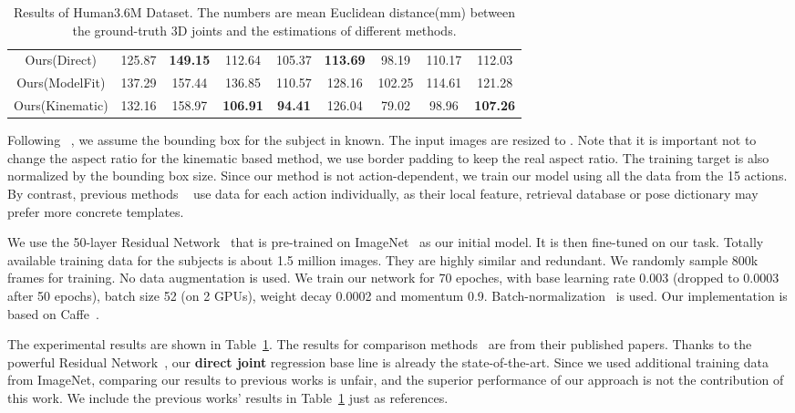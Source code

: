\documentclass[runningheads]{llncs}
\begin{document}
\begin{table}
\begin{center}
\begin{tabular}{ccccccccc}
Ours(Direct) & 125.87 & \bf 149.15 & 112.64 & 105.37 & \bf 113.69 & 98.19 & 110.17 & 112.03 \\
Ours(ModelFit) & 137.29 & 157.44 & 136.85 & 110.57 & 128.16 & 102.25 & 114.61 & 121.28 \\
Ours(Kinematic) & 132.16 & 158.97 & \bf 106.91 & \bf 94.41 & 126.04 & 79.02 & 98.96 & \bf 107.26 \\
\hline
\end{tabular}
\caption{Results of Human3.6M Dataset. The numbers are mean Euclidean distance(mm) between the ground-truth 3D joints and the estimations of different methods.}
\label{table:H36M}
\end{center}
\end{table}
\setlength{\tabcolsep}{1.4pt}

Following ~\cite{li20143d,tekin2016structured}, we assume the bounding box for the subject in known. The input images are resized to . Note that it is important not to change the aspect ratio for the kinematic based method, we use border padding to keep the real aspect ratio. The training target is also normalized by the bounding box size. Since our method is not action-dependent, we train our model using all the data from the 15 actions. By contrast, previous methods ~\cite{h36m_pami,Li_2015_ICCV,Zhou_2016_CVPR} use data for each action individually, as their local feature, retrieval database or pose dictionary may prefer more concrete templates.

We use the 50-layer Residual Network~\cite{He_2016_CVPR} that is pre-trained on ImageNet~\cite{DBLP:journals/corr/RussakovskyDSKSMHKKBBF14} as our initial model. It is then fine-tuned on our task. Totally available training data for the  subjects is about 1.5 million images. They are highly similar and redundant. We randomly sample 800k frames for training. No data augmentation is used. We train our network for 70 epoches, with base learning rate 0.003 (dropped to 0.0003 after 50 epochs), batch size 52 (on 2 GPUs), weight decay 0.0002 and momentum 0.9. Batch-normalization~\cite{ioffe2015batch} is used. Our implementation is based on Caffe~\cite{jia2014caffe}.

The experimental results are shown in Table~\ref{table:H36M}. The results for comparison methods~\cite{h36m_pami,li20143d,Li_2015_ICCV,tekin2016structured,tekin2016structured,Tekin_2016_CVPR,Zhou_2016_CVPR} are from their published papers. Thanks to the powerful Residual Network~\cite{He_2016_CVPR}, our \textbf{direct joint} regression base line is already the state-of-the-art. Since we used additional training data from ImageNet, comparing our results to previous works is unfair, and the superior performance of our approach is not the contribution of this work. We include the previous works' results in Table~\ref{table:H36M} just as references.
\end{document}
